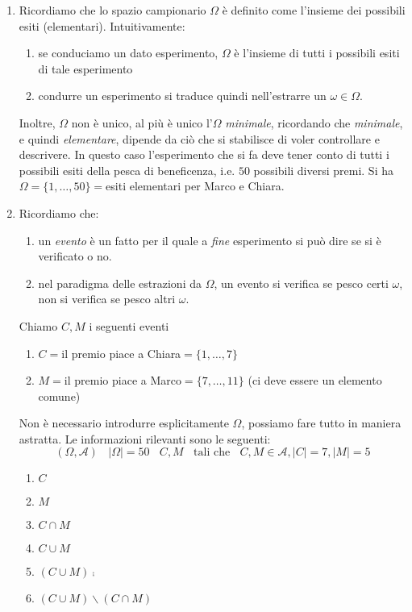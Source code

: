 \begin{enumerate}
\item Ricordiamo che lo spazio campionario $\Omega $ è definito come l'insieme dei possibili esiti (elementari). Intuitivamente:
\begin{enumerate}
\item se conduciamo un dato esperimento, $\Omega $ è l'insieme di tutti i possibili esiti di tale esperimento
\item condurre un esperimento si traduce quindi nell'estrarre un $\omega \in \Omega $.
\end{enumerate}

Inoltre, $\Omega $ non è unico, al più è unico l'$\Omega $ \textit{minimale}, ricordando che \textit{minimale}, e quindi \textit{elementare}, dipende da ciò che si stabilisce di voler controllare e descrivere. In questo caso l'esperimento che si fa deve tener conto di tutti i possibili esiti della pesca di beneficenza, i.e. $50$ possibili diversi premi. Si ha $\Omega =\{1,\dotsc ,50\} =$esiti elementari per Marco e Chiara.
\item Ricordiamo che:
\begin{enumerate}
\item un \textit{evento} è un fatto per il quale a \textit{fine} esperimento si può dire se si è verificato o no.
\item nel paradigma delle estrazioni da $\Omega $, un evento si verifica se pesco certi $\omega $, non si verifica se pesco altri $\omega $.
\end{enumerate}

Chiamo $C,M$ i seguenti eventi
\begin{enumerate}
\item $C=$il premio piace a Chiara$=\{1,\dotsc ,7\}$
\item $M=$il premio piace a Marco$=\{7,\dotsc ,11\}$ (ci deve essere un elemento comune)
\end{enumerate}

\begin{oss}
Non è necessario introdurre esplicitamente $\Omega $, possiamo fare tutto in maniera astratta. Le informazioni rilevanti sono le seguenti:\begin{equation*}
( \Omega ,\mathcal{A}) \ \ \ \ | \Omega | =50\ \ \ \ C,M\ \ \ \ \text{tali che} \ \ \ \ C,M\in \mathcal{A} ,| C| =7,| M| =5
\end{equation*}
\end{oss}
\begin{enumerate}
\item $C$
\item $M$
\item $C\cap M$
\item $C\cup M$
\item $( C\cup M)\comp$
\item $( C\cup M) \smallsetminus ( C\cap M)$
\end{enumerate}




\end{enumerate}
